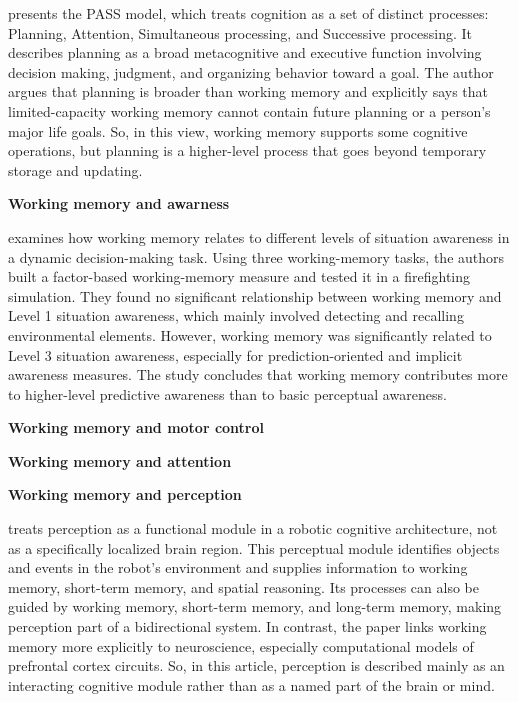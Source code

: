 \documentclass{book}
\providecommand{\ProjectDeepHeading}[2]{%
    \par\medskip\noindent\textbf{#2}\par\smallskip
}
\begin{document}
        \cite{das-2015-three-faces-of-cognitive-processes-theory-assessment-and-intervention}  presents the PASS model, which treats cognition as a set of distinct processes: Planning, Attention, Simultaneous processing, and Successive processing. It describes planning as a broad metacognitive and executive function involving decision making, judgment, and organizing behavior toward a goal. The author argues that planning is broader than working memory and explicitly says that limited-capacity working memory cannot contain future planning or a person’s major life goals.
        So, in this view, working memory supports some cognitive operations, but planning is a higher-level process that goes beyond temporary storage and updating.
    
    
    \ProjectDeepHeading{7}{Working memory and awarness}
        \cite{gutzwiller-2013-the-role-of-working-memory-in-levels-of-situation-awareness} examines how working memory relates to different levels of situation awareness in a dynamic decision-making task. Using three working-memory tasks, the authors built a factor-based working-memory measure and tested it in a firefighting simulation. They found no significant relationship between working memory and Level 1 situation awareness, which mainly involved detecting and recalling environmental elements. However, working memory was significantly related to Level 3 situation awareness, especially for prediction-oriented and implicit awareness measures. The study concludes that working memory contributes more to higher-level predictive awareness than to basic perceptual awareness.
    
    
    
    \ProjectDeepHeading{7}{Working memory and motor control}
        \cite{marvel-2019-how-the-motor-system-integrates-with-working-memory}
        
        \cite{mcdougle-2026-motor-working-memory}
    
    \ProjectDeepHeading{7}{Working memory and attention}
    
        \cite{oberauer-2019-working-memory-and-attention-a-conceptual-analysis-and-review}
    
    
    \ProjectDeepHeading{7}{Working memory and perception}
        \cite{wilkes-2005-working-memory-and-perception} treats perception as a functional module in a robotic cognitive architecture, not as a specifically localized brain region.
        This perceptual module identifies objects and events in the robot’s environment and supplies information to working memory, short-term memory, and spatial reasoning.
        Its processes can also be guided by working memory, short-term memory, and long-term memory, making perception part of a bidirectional system.
        In contrast, the paper links working memory more explicitly to neuroscience, especially computational models of prefrontal cortex circuits.
        So, in this article, perception is described mainly as an interacting cognitive module rather than as a named part of the brain or mind.
\end{document}
